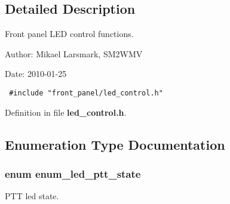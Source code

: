 \subsection{Detailed Description}
Front panel LED control functions. 

\begin{Desc}
\item[Author:]Mikael Larsmark, SM2WMV \end{Desc}
\begin{Desc}
\item[Date:]2010-01-25 

\begin{Code}\begin{verbatim} #include "front_panel/led_control.h" 
\end{verbatim}
\end{Code}

 \end{Desc}


Definition in file {\bf led\_\-control.h}.

\subsection{Enumeration Type Documentation}
\subsubsection[{enum\_\-led\_\-ptt\_\-state}]{\setlength{\rightskip}{0pt plus 5cm}enum {\bf enum\_\-led\_\-ptt\_\-state}}\label{led__control_8h_da31a3268524c326594606626e93f391}


PTT led state. 

